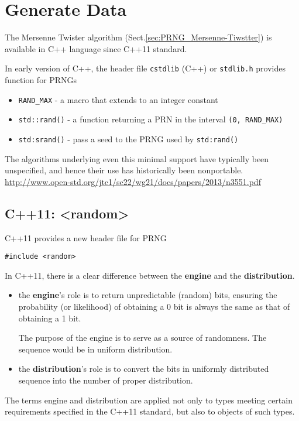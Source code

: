 
\chapter{Generate Data}
\label{chap:generate-data}

The Mersenne Twister algorithm (Sect.\ref{sec:PRNG_Mersenne-Tiwstter}) is
available in C++ language since C++11 standard.

In early version of C++, the header file \verb!cstdlib! (C++) or \verb!stdlib.h! provides function for PRNGs
\begin{itemize}
  \item \verb!RAND_MAX! - a macro that extends to an integer constant
  
  \item \verb!std::rand()! - a function returning a PRN in the interval \verb!(0, RAND_MAX)!
  
  \item \verb!std:srand()! - pass a seed to the PRNG used by \verb!std:rand()!
\end{itemize}
The algorithms underlying even this minimal support have typically been unspecified, and
hence their use has historically been nonportable. 
\url{http://www.open-std.org/jtc1/sc22/wg21/docs/papers/2013/n3551.pdf}

\section{C++11: <random>}
\label{sec:C++11_random}


C++11 provides a new header file for PRNG 
\begin{lstlisting}
#include <random>
\end{lstlisting}
In C++11, there is a clear difference between the {\bf engine} and the {\bf distribution}.
\begin{itemize}
  \item the {\bf engine}'s role is to return unpredictable (random) bits, ensuring the probability (or likelihood) of obtaining
  a 0 bit is always the same as that of obtaining a 1 bit.
  
The purpose of the engine is to serve as a source of randomness. The sequence would be in uniform distribution.  
  
  \item the {\bf distribution}'s role is to convert the bits in uniformly distributed sequence into the number of proper distribution.
\end{itemize}
The terms engine and distribution are applied not only to types meeting certain requirements specified in the C++11
standard, but also to objects of such types.

